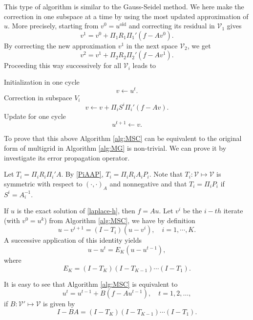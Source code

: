 This type of algorithm is similar to the Gauss-Seidel method.
We here make the correction in one subspace at a time by using the most
updated approximation of $u$.  More precisely, starting from
$v^{0}= u^{\text{old}}$ and correcting its residual in $\mathcal  V_1$ gives
$$
v^1=v^{0}+\Pi_1R_1\Pi_1'(f-Av^0).
$$
By correcting the new approximation $v^1$ in the next space $\mathcal V_2$,
we get
$$
v^2=v^1+\Pi_2R_2\Pi_2'(f-Av^1).
$$
Proceeding this way successively for all $\mathcal V_i$ leads to
\begin{breakablealgorithm}%
	\caption{$u^T = MSC(u^0)$}
	\label{alg:MSC}
	\begin{algorithmic}
		\State  Initialization in one cycle 
		$$
		v \leftarrow u^t.
		$$
		\State Correction in subspace $V_i$
		$$
		v \leftarrow v+\Pi_iS^i\Pi_i'(f-Av).
		$$
		\EndFor
		\State Update for one cycle
		$$
		u^{t+1} \leftarrow v.
		$$
		\EndFor
	\end{algorithmic}
\end{breakablealgorithm}


To prove that this above Algorithm \ref{alg:MSC} can be 
equivalent to the original form of multigrid in Algorithm \ref{alg:MG}
is non-trivial. We can prove it by investigate its error propagation operator. 

Let $T_i = \Pi_iR_i\Pi_i'A$. By \eqref{PiAAP}, $T_i=\Pi_iR_iA_iP_i.$ Note that $T_i:
\mathcal  V \mapsto \mathcal  V$ is symmetric with respect to $(\cdot, \cdot)_A$ and nonnegative
and that $T_i=\Pi_iP_i$ if $S^i=A_i^{-1}$.

If $u$ is the exact solution of \eqref{laplace-h}, then $f=Au$.  Let $v^i$ be
the $i-th$ iterate (with $v^0=u^k$) from Algorithm \ref{alg:MSC}, we have by
definition
$$
u-v^{i+1}=(I-T_i)(u-v^i),\quad i=1,\cdots,K.
$$
A successive application of this identity yields
\begin{equation}\label{error}
u-u^t=E_K(u-u^{t-1}),
\end{equation}
where
\begin{equation}\label{Em}
E_K=(I-T_K)(I-T_{K-1})\cdots(I-T_1).
\end{equation}

It is easy to see that Algorithm \ref{alg:MSC} is equivalent to 
$$
u^t=u^{t-1}+B(f - Au^{t-1}), \quad t=1,2,\ldots,
$$
if $B: \mathcal V' \mapsto \mathcal V$ is given by 
\begin{equation}
\label{SSC-B}
I-BA= (I-T_K)(I-T_{K-1})\cdots(I-T_1). 
\end{equation}


